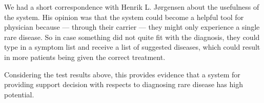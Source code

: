 We had a short correspondence with Henrik L. J\o rgensen about the
usefulness of the system. His opinion was that the system could become a
helpful tool for physician because --- through their carrier --- they might
only experience a single rare disease. So in case something did not
quite fit with the diagnosis, they could type in a symptom list and
receive a list of suggested diseases, which could result in more patients
being given the correct treatment.

Considering the test results above, this provides evidence that a
system for providing support decision with respects to diagnosing rare
disease has high potential.
